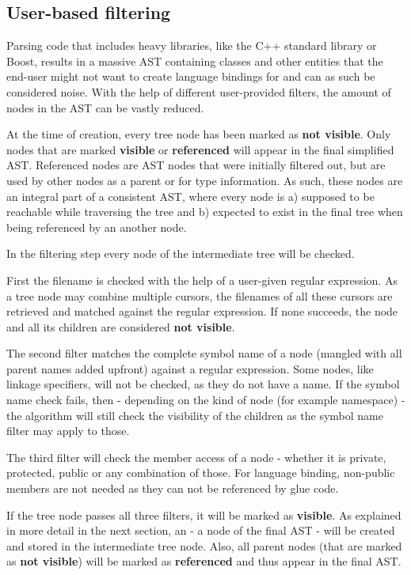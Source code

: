 \subsection{User-based filtering}

Parsing code that includes heavy libraries, like the C++ standard library or Boost, results in a massive AST containing classes and other entities that the end-user might not want to create language bindings for and can as such be considered noise. With the help of different user-provided filters, the amount of nodes in the AST can be vastly reduced. 

At the time of creation, every tree node has been marked as \textbf{not visible}. Only nodes that are marked \textbf{visible} or \textbf{referenced} will appear in the final simplified AST. Referenced nodes are AST nodes that were initially filtered out, but are used by other nodes as a parent or for type information. As such, these nodes are an integral part of a consistent AST, where every node is a) supposed to be reachable while traversing the tree and b) expected to exist in the final tree when being referenced by an another node.

In the filtering step every node of the intermediate tree will be checked.

First the filename is checked with the help of a user-given regular expression. As a tree node may combine multiple cursors, the filenames of all these cursors are retrieved and matched against the regular expression. If none succeeds, the node and all its children are considered \textbf{not visible}.

The second filter matches the complete symbol name of a node (mangled with all parent names added upfront) against a regular expression. Some nodes, like linkage specifiers, will not be checked, as they do not have a name. If the symbol name check fails, then - depending on the kind of node (for example namespace) - the algorithm will still check the visibility of the children as the symbol name filter may apply to those.

The third filter will check the member access of a node - whether it is private, protected, public or any combination of those. For language binding, non-public members are not needed as they can not be referenced by glue code.

If the tree node passes all three filters, it will be marked as \textbf{visible}. As explained in more detail in the next section, an  - a node of the final AST - will be created and stored in the intermediate tree node. Also, all parent nodes (that are marked as \textbf{not visible}) will be marked as \textbf{referenced} and thus appear in the final AST.


